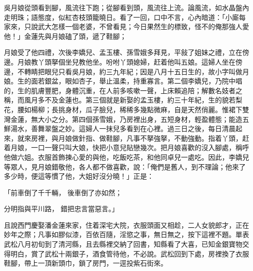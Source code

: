 吳月娘從頭看到腳，風流往下跑；從腳看到頭，風流往上流。論風流，如水晶盤內走明珠；語態度，似紅杏枝頭籠曉日。看了一回，口中不言，心內暗道：「小廝每家來，只說武大怎樣一個老婆，不曾看見；今日果然生的標致，怪不的俺那強人愛他！」金蓮先與月娘磕了頭，遞了鞋腳；

月娘受了他四禮，次後李嬌兒、孟玉樓、孫雪娥多拜見，平敍了姐妹之禮，立在傍邊。月娘教丫頭拏個坐兒教他坐。吩咐丫頭媳婦，赶着他叫五娘。這婦人坐在傍邊，不轉睛把眼兒只看吳月娘，約三九年紀；因是八月十五日生的，故小字叫做月娘。生的面若銀盆，眼如杏子，舉止溫柔，持重寡言。第二個李嬌兒，乃院中唱的，生的肌膚豐肥，身體沉重，在人前多咳嗽一聲，上床賴追陪；解數名妓者之稱，而風月多不及金蓮也。第三個就是新娶的孟玉樓，約三十年紀，生的貌若梨花，腰如楊柳；長挑身材，瓜子臉兒，稀稀多幾點微麻，自是天然俏麗。惟裙下雙灣金蓮，無大小之分。第四個孫雪娥，乃房裡出身，五短身材，輕盈體態；能造五鮮湯水，善舞翠盤之妙。這婦人一抹兒多看到在心裡。過三日之後，每日清晨起來，就來房裡，與月娘做針指、做鞋腳，凡事不拏強拏，不動強動。指着丫頭，赶着月娘，一口一聲只叫大娘，快把小意兒貼戀幾次。把月娘喜歡的沒入腳處，稱呼他做六姐。衣服首飾揀心愛的與他，吃飯吃茶，和他同卓兒一處吃。因此，李嬌兒等眾人，見月娘錯敬他，各人都不做喜歡，說：「俺們是舊人，到不理論；他來了多少時，便這等慣了他，大姐好沒分曉！」正是：

「前車倒了千千輛，  後車倒了亦如然；

分明指與平川路，  錯把忠言當惡言。」

且說西門慶娶潘金蓮來家，住着深宅大院，衣服頭面又相趁，二人女貌郎才，正在妙年之際；凡事如膠似漆，百依百隨，淫慾之事，無日無之，按下這裡不題。單表武松八月初旬到了清河縣，且去縣裡交納了回書，知縣看了大喜，已知金銀寶物交得明白，賞了武松十兩銀子，酒食管待他，不必說。武松回到下處，房裡換了衣服鞋腳，帶上一頂新頭巾，鎖了房門，一逕投紫石街來。

